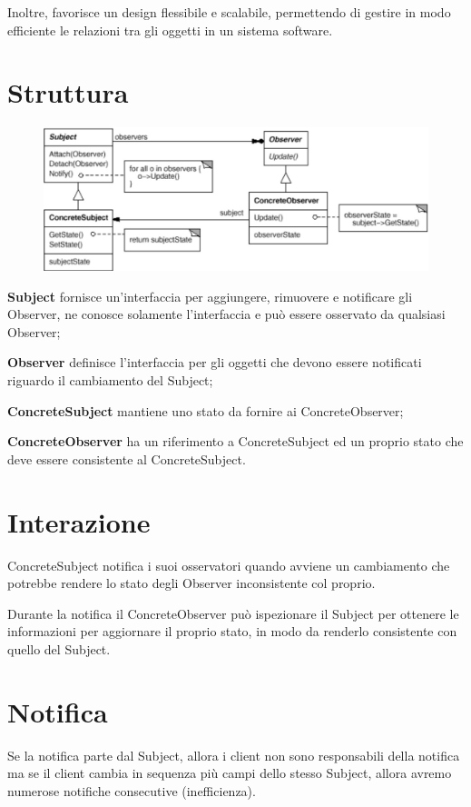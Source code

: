 Inoltre, favorisce un design flessibile e scalabile, permettendo di gestire in modo efficiente le relazioni tra gli oggetti in un sistema software.

\section{Struttura}

\begin{figure}[H]
    \centering
    \includegraphics[width=0.5\linewidth]{../../immagini/observer_publishSubscribe/struttura_observer}
\end{figure}

\textbf{Subject} fornisce un'interfaccia per aggiungere, rimuovere e notificare gli Observer, ne conosce solamente l'interfaccia e può essere osservato da qualsiasi 
Observer;

\textbf{Observer} definisce l'interfaccia per gli oggetti che devono essere notificati riguardo il cambiamento del Subject;

\textbf{ConcreteSubject} mantiene uno stato da fornire ai ConcreteObserver;

\textbf{ConcreteObserver} ha un riferimento a ConcreteSubject ed un proprio stato che deve essere consistente al ConcreteSubject. 

\section{Interazione}

ConcreteSubject notifica i suoi osservatori quando avviene un cambiamento che potrebbe rendere lo stato degli Observer inconsistente col proprio.

Durante la notifica il ConcreteObserver può ispezionare il Subject per ottenere le informazioni per aggiornare il proprio stato, in modo da renderlo consistente con
quello del Subject.

\section{Notifica}

Se la notifica parte dal Subject, allora i client non sono responsabili della notifica ma se il client cambia in sequenza più campi dello stesso Subject, allora 
avremo numerose notifiche consecutive (inefficienza).

